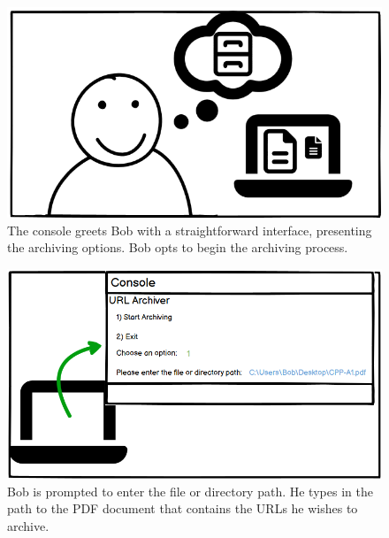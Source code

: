 \begin{figure}[h!]
    \centering
    \includegraphics[width=1\textwidth]{pictures/Story Board/StoryBoard_1}
    \caption{The console greets Bob with a straightforward interface, presenting the archiving options. Bob opts to begin the archiving process.}
    \label{fig:StoryBoard_1}
\end{figure}
\begin{figure}[h!]
    \centering
    \includegraphics[width=1\textwidth]{pictures/Story Board/StoryBoard_2}
    \caption{Bob is prompted to enter the file or directory path. He types in the path to the PDF document that contains the URLs he wishes to archive.}
    \label{fig:StoryBoard_2}
\end{figure}
